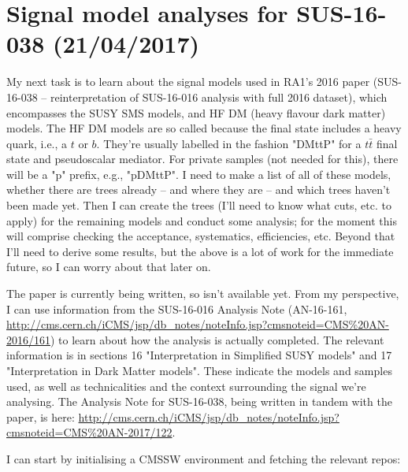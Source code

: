 
\chapter{Signal model analyses for SUS-16-038 (21/04/2017)}

My next task is to learn about the signal models used in RA1's 2016 paper (SUS-16-038 -- reinterpretation of SUS-16-016 analysis with full 2016 dataset), which encompasses the SUSY SMS models, and HF DM (heavy flavour dark matter) models. The HF DM models are so called because the final state includes a heavy quark, i.e., a $t$ or $b$. They're usually labelled in the fashion "DMttP" for a $t\bar{t}$ final state and pseudoscalar mediator. For private samples (not needed for this), there will be a "p" prefix, e.g., "pDMttP". I need to make a list of all of these models, whether there are trees already -- and where they are -- and which trees haven't been made yet. Then I can create the trees (I'll need to know what cuts, etc. to apply) for the remaining models and conduct some analysis; for the moment this will comprise checking the acceptance, systematics, efficiencies, etc. Beyond that I'll need to derive some results, but the above is a lot of work for the immediate future, so I can worry about that later on.

The paper is currently being written, so isn't available yet. From my perspective, I can use information from the SUS-16-016 Analysis Note (AN-16-161, \url{http://cms.cern.ch/iCMS/jsp/db_notes/noteInfo.jsp?cmsnoteid=CMS\%20AN-2016/161}) to learn about how the analysis is actually completed. The relevant information is in sections 16 "Interpretation in Simplified SUSY models" and 17 "Interpretation in Dark Matter models". These indicate the models and samples used, as well as technicalities and the context surrounding the signal we're analysing. The Analysis Note for SUS-16-038, being written in tandem with the paper, is here: \url{http://cms.cern.ch/iCMS/jsp/db_notes/noteInfo.jsp?cmsnoteid=CMS\%20AN-2017/122}. 

I can start by initialising a CMSSW environment and fetching the relevant repos:

